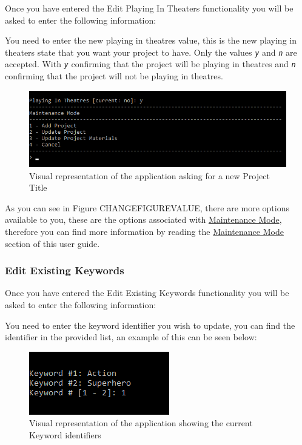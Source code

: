 \documentclass[
  english,
  a4paper,
,tablecaptionabove
]{scrartcl}
\begin{document}
Once you have entered the Edit Playing In Theaters functionality you
will be asked to enter the following information:

You need to enter the new playing in theatres value, this is the new
playing in theaters state that you want your project to have. Only the
values \emph{\texttt{y}} and \emph{\texttt{n}} are accepted. With
\emph{\texttt{y}} confirming that the project will be playing in
theatres and \emph{\texttt{n}} confirming that the project will not be
playing in theatres.

\begin{figure}
\centering
\includegraphics{images/user-guide/maintenance-mode/update-project-playing-in-theaters.png}
\caption{Visual representation of the application asking for a new
Project Title}
\end{figure}

As you can see in Figure CHANGEFIGUREVALUE, there are more options
available to you, these are the options associated with
\protect\hyperlink{using-maintenance-mode}{Maintenance Mode}, therefore
you can find more information by reading the
\protect\hyperlink{using-maintenance-mode}{Maintenance Mode} section of
this user guide.

\newpage

\hypertarget{edit-existing-keywords}{%
\subsubsection{Edit Existing Keywords}\label{edit-existing-keywords}}

Once you have entered the Edit Existing Keywords functionality you will
be asked to enter the following information:

You need to enter the keyword identifier you wish to update, you can
find the identifier in the provided list, an example of this can be seen
below:

\begin{figure}
\centering
\includegraphics{images/user-guide/maintenance-mode/update-project-select-keyword.png}
\caption{Visual representation of the application showing the current
Keyword identifiers}
\end{figure}
\end{document}

